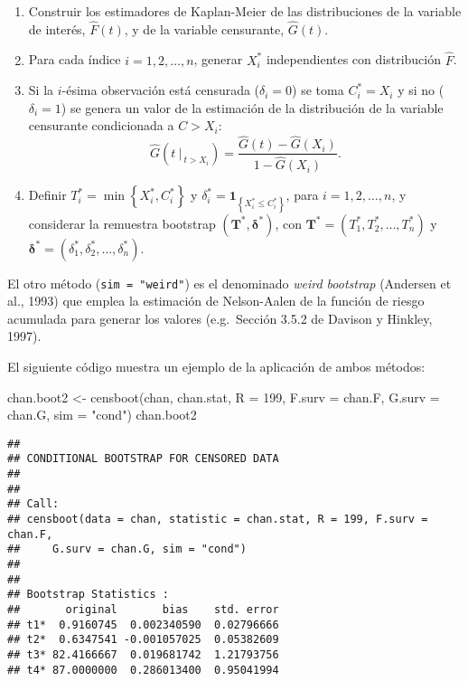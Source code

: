 \documentclass[
]{book}
\newenvironment{Shaded}{\begin{snugshade}}{\end{snugshade}}
\newcommand{\AttributeTok}[1]{\textcolor[rgb]{0.77,0.63,0.00}{#1}}
\newcommand{\DecValTok}[1]{\textcolor[rgb]{0.00,0.00,0.81}{#1}}
\newcommand{\FunctionTok}[1]{\textcolor[rgb]{0.00,0.00,0.00}{#1}}
\newcommand{\NormalTok}[1]{#1}
\newcommand{\OtherTok}[1]{\textcolor[rgb]{0.56,0.35,0.01}{#1}}
\newcommand{\StringTok}[1]{\textcolor[rgb]{0.31,0.60,0.02}{#1}}
\theoremstyle{break}
\theoremstyle{definition}
\theoremstyle{definition}
\theoremstyle{definition}
\theoremstyle{definition}
\theoremstyle{remark}
\begin{document}
\begin{enumerate}
\def\labelenumi{\arabic{enumi}.}
\item
  Construir los estimadores de Kaplan-Meier de las distribuciones de
  la variable de interés, \(\hat{F}\left( t \right)\), y de la variable
  censurante, \(\hat{G}\left( t \right)\).
\item
  Para cada índice \(i=1,2,\ldots ,n\), generar \(X_i^{\ast}\) independientes
  con distribución \(\hat{F}\).
\item
  Si la \(i\)-ésima observación está censurada (\(\delta_i=0\)) se toma
  \(C_i^{\ast}=X_i\) y si no (\(\delta_i=1\)) se genera un valor de la estimación
  de la distribución de la variable censurante condicionada a \(C > X_i\):
  \[\hat G \left(\left. t \ \right\vert_{\ t > X_i} \right) 
  = \frac{\hat G(t) - \hat G(X_i)}{1- \hat G(X_i)}.\]
\item
  Definir \(T_i^{\ast}=\min \left\{ X_i^{\ast},C_i^{\ast}\right\}\) y
  \(\delta_i^{\ast}=\mathbf{1}_{\left\{ X_i^{\ast}\leq C_i^{\ast}\right\}}\), para \(i = 1, 2, \ldots, n\),
  y considerar la remuestra bootstrap
  \(\left( \mathbf{T}^{\ast},\boldsymbol{\delta}^{\ast}\right)\), con
  \(\mathbf{T}^{\ast}=\left( T_1^{\ast},T_2^{\ast}, \ldots, T_n^{\ast} \right)\) y \(\boldsymbol{\delta}^{\ast} = \left( \delta_1^{\ast}, \delta_2^{\ast},\ldots ,\delta_n^{\ast} \right)\).
\end{enumerate}

El otro método (\texttt{sim\ =\ "weird"}) es el denominado \emph{weird bootstrap}
(Andersen et al., 1993) que emplea la estimación de Nelson-Aalen de la
función de riesgo acumulada para generar los valores
(e.g.~Sección 3.5.2 de Davison y Hinkley, 1997).

El siguiente código muestra un ejemplo de la aplicación de ambos métodos:

\begin{Shaded}
\begin{Highlighting}[]
\NormalTok{chan.boot2 }\OtherTok{\textless{}{-}} \FunctionTok{censboot}\NormalTok{(chan, chan.stat, }\AttributeTok{R =} \DecValTok{199}\NormalTok{, }\AttributeTok{F.surv =}\NormalTok{ chan.F, }
                  \AttributeTok{G.surv =}\NormalTok{ chan.G, }\AttributeTok{sim =} \StringTok{"cond"}\NormalTok{)}
\NormalTok{chan.boot2}
\end{Highlighting}
\end{Shaded}

\begin{verbatim}
## 
## CONDITIONAL BOOTSTRAP FOR CENSORED DATA
## 
## 
## Call:
## censboot(data = chan, statistic = chan.stat, R = 199, F.surv = chan.F, 
##     G.surv = chan.G, sim = "cond")
## 
## 
## Bootstrap Statistics :
##       original       bias    std. error
## t1*  0.9160745  0.002340590  0.02796666
## t2*  0.6347541 -0.001057025  0.05382609
## t3* 82.4166667  0.019681742  1.21793756
## t4* 87.0000000  0.286013400  0.95041994
\end{verbatim}
\end{document}
